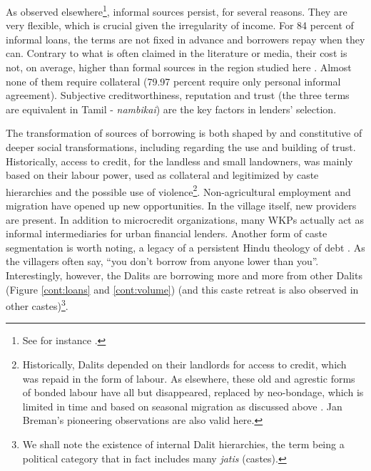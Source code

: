 \documentclass[a4paper, 11pt, onecolumn]{article}
\begin{document}
As observed elsewhere\footnote{See for instance \cite{Morvant2013, Collins2009, Shipton2007, James2015, Saiag2020, Guerin2013}.},  informal sources persist, for several reasons. They are very flexible, which is crucial given the irregularity of income. For 84 percent of informal loans, the terms are not fixed in advance and borrowers repay when they can. Contrary to what is often claimed in the literature or media, their cost is not, on average, higher than formal sources in the region studied here \citep{Reboul2019}. Almost none of them require collateral (79.97 percent require only personal informal agreement). Subjective creditworthiness, reputation and trust (the three terms are equivalent in Tamil - \textit{nambikai}) are the key factors in lenders' selection. 

The transformation of sources of borrowing is both shaped by and constitutive of deeper social transformations, including regarding the use and building of trust. Historically, access to credit, for the landless and small landowners, was mainly based on their labour power, used as collateral and legitimized by caste hierarchies and the possible use of violence\footnote{Historically, Dalits depended on their landlords for access to credit, which was repaid in the form of labour. As elsewhere, these old and agrestic forms of bonded labour have all but disappeared, replaced by neo-bondage, which is limited in time and based on seasonal migration as discussed above \citep{Breman1974}. Jan Breman's pioneering observations are also valid here.}. Non-agricultural employment and migration have opened up new opportunities. In the village itself, new providers are present. In addition to microcredit organizations, many WKPs actually act as informal intermediaries for urban financial lenders. Another form of caste segmentation is worth noting, a legacy of a persistent Hindu theology of debt \citep{Kane2012}. As the villagers often say, ``you don't borrow from anyone lower than you''. Interestingly, however, the Dalits are borrowing more and more from other Dalits (Figure \ref{cont:loans} and \ref{cont:volume}) (and this caste retreat is also observed in other castes)\footnote{We shall note the existence of internal Dalit hierarchies, the term being a political category that in fact includes many \textit{jatis} (castes).}.  
\end{document}
